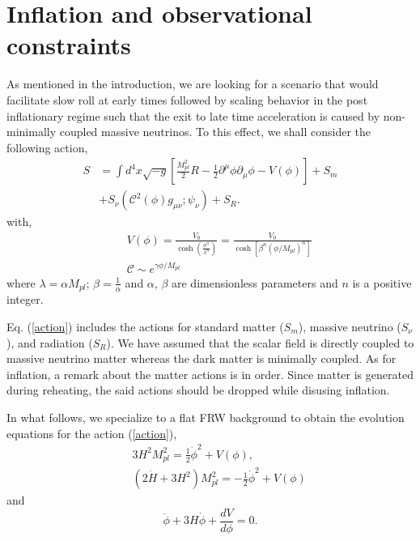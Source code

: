 \documentclass[prd,twocolumn,superscriptaddress]{revtex4}
\begin{document}
\section{Inflation and observational constraints}
As mentioned in the introduction, we are looking for a scenario that would facilitate slow roll at early times followed by scaling behavior in the post inflationary regime such that the exit to late time acceleration is caused by non-minimally coupled massive neutrinos. To this effect, we shall 
consider the following action,
\begin{align}
\label{action}
S &= \int{d^4 x \sqrt{-g} \left[ \frac{M_{pl}^2}{2} R - \frac{1}{2} {\partial^{\mu} \phi} {\partial_{\mu} \phi} - V (\phi) \right]}
+S_m  \nonumber \\ & +S_{\nu}\left(\mathcal{C}^2(\phi) g_{\mu\nu};\psi_{\nu}\right)+ S_R.
\end{align}
with,
\begin{eqnarray}
\label{ourpot}
&& V(\phi) = \frac{V_0}{\cosh \left( \frac{\phi^n}{\lambda^n} \right)}= \frac{V_0}{\cosh[{\beta^n (\phi/M_{pl})^n}]}\\
&& \mathcal{C}\sim e^{\gamma \phi/M_{pl}}
\end{eqnarray}
where $\lambda = \alpha M_{pl}$; $\beta = \frac{1}{\alpha}$ and $\alpha$, $\beta$ are dimensionless parameters and $n$ is a positive integer.  

Eq. (\ref{action}) includes the actions for standard matter ($S_m$), massive neutrino ($S_\nu$), and radiation ($S_R$). We have assumed that the scalar field is directly coupled to massive neutrino matter whereas the dark matter is minimally coupled. As for inflation, a remark about the matter actions is in order. Since matter is generated during reheating, the said actions should be dropped while disusing inflation.
 
In what follows, we specialize
to  a flat FRW background  to obtain the evolution equations for the  action (\ref{action}),
\begin{eqnarray}
&& 3 H^2 M_{pl}^2 =
\frac{1}{2} {\dot{\phi}}^2 + V (\phi) \label{Frone},\\
&& \left( 2 \dot{H} + 3 H^2 \right) M_{pl}^2 = - \frac{1}{2} {\dot{\phi}}^2 + V (\phi) \label{Frtwo}
\end{eqnarray}
and
\begin{equation}
\ddot{\phi} + 3 H \dot{\phi} + \frac{d V}{d \phi} = 0.
\end{equation}
\end{document}
